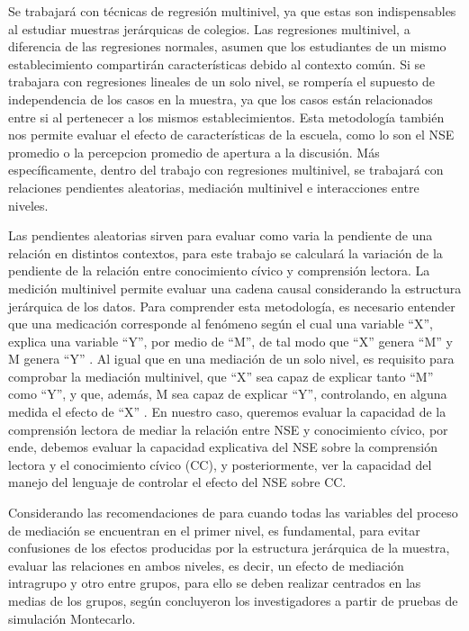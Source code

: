 \documentclass[12pt,twoside]{templates/facsothesis}
\begin{document}
Se trabajará con técnicas de regresión multinivel, ya que estas son indispensables al estudiar muestras jerárquicas de colegios. Las regresiones multinivel, a diferencia de las regresiones normales, asumen que los estudiantes de un mismo establecimiento compartirán características debido al contexto común. Si se trabajara con regresiones lineales de un solo nivel, se rompería el supuesto de independencia de los casos en la muestra, ya que los casos están relacionados entre si al pertenecer a los mismos establecimientos. Esta metodología también nos permite evaluar el efecto de características de la escuela, como lo son el NSE promedio o la percepcion promedio de apertura a la discusión. Más específicamente, dentro del trabajo con regresiones multinivel, se trabajará con relaciones pendientes aleatorias, mediación multinivel e interacciones entre niveles.

Las pendientes aleatorias sirven para evaluar como varia la pendiente de una relación en distintos contextos, para este trabajo se calculará la variación de la pendiente de la relación entre conocimiento cívico y comprensión lectora.
La medición multinivel permite evaluar una cadena causal considerando la estructura jerárquica de los datos. Para comprender esta metodología, es necesario entender que una medicación corresponde al fenómeno según el cual una variable ``X'', explica una variable ``Y'', por medio de ``M'', de tal modo que ``X'' genera ``M'' y M genera ``Y'' \citep{mathieuFrameworkTestingMesomediational2007}. Al igual que en una mediación de un solo nivel, es requisito para comprobar la mediación multinivel, que ``X'' sea capaz de explicar tanto ``M'' como ``Y'', y que, además, M sea capaz de explicar ``Y'', controlando, en alguna medida el efecto de ``X'' \citep{baronModeratorMediatorVariable1986}. En nuestro caso, queremos evaluar la capacidad de la comprensión lectora de mediar la relación entre NSE y conocimiento cívico, por ende, debemos evaluar la capacidad explicativa del NSE sobre la comprensión lectora y el conocimiento cívico (CC), y posteriormente, ver la capacidad del manejo del lenguaje de controlar el efecto del NSE sobre CC.

Considerando las recomendaciones de \citep{zhangTestingMultilevelMediation2009} para cuando todas las variables del proceso de mediación se encuentran en el primer nivel, es fundamental, para evitar confusiones de los efectos producidas por la estructura jerárquica de la muestra, evaluar las relaciones en ambos niveles, es decir, un efecto de mediación intragrupo y otro entre grupos, para ello se deben realizar centrados en las medias de los grupos, según concluyeron los investigadores a partir de pruebas de simulación Montecarlo.
\end{document}
